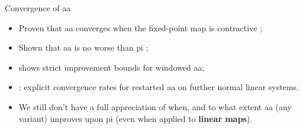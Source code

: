 \documentclass[aspectratio=169]{beamer}
\begin{document}
\begin{frame}{Convergence of \gls{aa}}
    \begin{itemize}
        \item Proven that \gls{aa} converges when the fixed-point map is contractive
            \parencite{Toth2015};  \pause
        \item Shown that \gls{aa} is no worse than \gls{pi} \parencite{Evans2020};
             \pause 
        \item  \parencite{Garner2023} shows strict improvement bounds  for windowed \gls{aa};  \pause
        \item  \parencite{De_Sterck2022}:  explicit convergence rates  for restarted \gls{aa} on further normal
            linear systems. \pause
        \item {\color{red} We still don't have a full appreciation of when, and to what
            extent \gls{aa} (any variant) improves upon \gls{pi} (even when applied to
            \textbf{linear maps}).}
    \end{itemize}
\end{frame}
\end{document}
